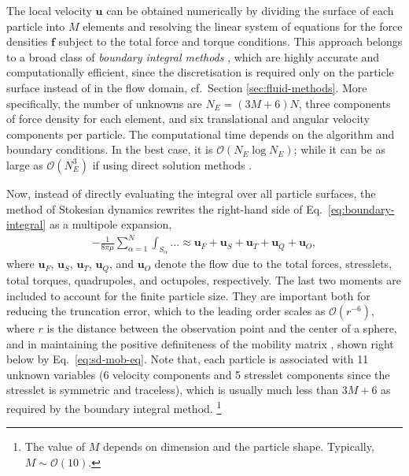 The local velocity $\bm{u}$ can be obtained numerically by dividing the surface of each particle into $M$ elements and resolving the linear system of equations for the force densities $\bm f$ subject to the total force and torque conditions.
This approach belongs to a broad class of \emph{boundary integral methods} \citep{Pozrikidis}, which are highly accurate and computationally efficient, since the discretisation is required only on the particle surface instead of in the flow domain, cf.\ Section \ref{sec:fluid-methods}.
More specifically, the number of unknowns are $N_E=(3M+6)N$, \ie three components of force density for each element, and six translational and angular velocity components per particle.
The computational time depends on the algorithm and boundary conditions.
In the best case, it is $\mathcal{O}(N_E\log N_E)$; while it can be as large as $\mathcal{O}(N_E^3)$ if using direct solution methods \citep{graham_2018}.

Now, instead of directly evaluating the integral over all particle surfaces, the method of Stokesian dynamics \citep{durlofsky_brady_bossis_1987} rewrites the right-hand side of Eq.\ \eqref{eq:boundary-integral} as a multipole expansion, \viz
\begin{equation} \label{eq:sd-multipole}
 \begin{aligned}
  - \frac{1}{8\pi \mu} \sum_{\alpha=1}^N  \int_{S_\alpha} ... \approx \bm{u}_F + \bm{u}_S + \bm{u}_T + \bm{u}_Q + \bm{u}_O , 
 \end{aligned}
\end{equation}
where $\bm{u}_F$, $\bm{u}_S$, $\bm{u}_T$, $\bm{u}_Q$, and $\bm{u}_O$ denote the flow due to the total forces, stresslets, total torques, quadrupoles, and octupoles, respectively.
The last two moments are included to account for the finite particle size. They are important both for reducing the truncation error, which to the leading order scales as $\mathcal{O}(r^{-6})$, where $r$ is the distance between the observation point and the center of a sphere, and in maintaining the positive definiteness of the mobility matrix \citep{durlofsky_brady_bossis_1987}, shown right below by Eq.\ \eqref{eq:sd-mob-eq}.
Note that, each particle is associated with 11 unknown variables (6 velocity components and 5 stresslet components since the stresslet is symmetric and traceless), which is usually much less than $3M+6$ as required by the boundary integral method.%
\footnote{The value of $M$ depends on dimension and the particle shape. Typically, $M \sim \mathcal{O}(10)$.}

